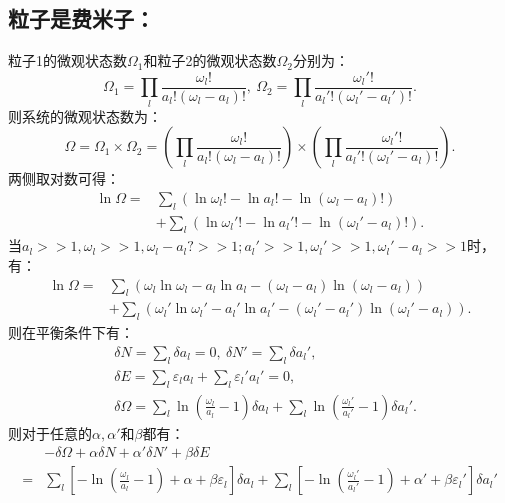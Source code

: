 \documentclass[a4paper,12pt]{article}
\begin{document}
\subsection{粒子是费米子：}
粒子1的微观状态数$\Omega_1$和粒子2的微观状态数$\Omega_2$分别为：
\begin{equation}\nonumber
	\Omega_1 = \prod_l \frac{\omega_l!}{a_l!(\omega_l - a_l)!}, ~ \Omega_2 = \prod_l \frac{\omega_l'!}{a_l'!(\omega_l' - a_l')!}.
\end{equation}
则系统的微观状态数为：
\begin{equation}\nonumber
	\Omega = \Omega_1 \times \Omega_2 = \left( \prod_l \frac{\omega_l!}{a_l!(\omega_l - a_l)!} \right) \times \left( \prod_l \frac{\omega_l'!}{a_l'!(\omega_l' - a_l)!} \right). 
\end{equation}
两侧取对数可得：
\begin{equation}\nonumber
\begin{aligned}
	\ln \Omega =& \sum_l \left( \ln\omega_l! - \ln a_l! - \ln (\omega_l - a_l)! \right)\\ 
	&+ \sum_l \left( \ln\omega_l'! - \ln a_l'! -\ln (\omega_l' - a_l)! \right).
\end{aligned}
\end{equation}
当$a_l>>1,\omega_l>>1,\omega_l-a_l?>>1;a_l'>>1,\omega_l'>>1,\omega_l'-a_l>>1$时，有：
\begin{equation}\nonumber
\begin{aligned}
	\ln \Omega =& \sum_l \left( \omega_l\ln\omega_l - a_l \ln a_l - (\omega_l - a_l)\ln (\omega_l - a_l) \right) \\ 
	&+ \sum_l \left( \omega_l'\ln\omega_l' - a_l' \ln a_l' - (\omega_l' - a_l')\ln (\omega_l' - a_l) \right).
\end{aligned}
\end{equation}
则在平衡条件下有：
\begin{equation}\nonumber
\begin{aligned}
	&\delta N = \sum_l \delta a_l = 0, ~ \delta N' = \sum_l \delta a_l', \\
	&\delta E = \sum_l \varepsilon_l a_l + \sum_l \varepsilon_l' a_l' = 0, \\
	&\delta \Omega = \sum_l \ln\left( \frac{\omega_l}{a_l} - 1 \right) \delta a_l + \sum_l \ln \left( \frac{\omega_l'}{a_l'} - 1 \right) \delta a_l'.
\end{aligned}
\end{equation}
则对于任意的$\alpha,\alpha'$和$\beta$都有：
\begin{equation}\nonumber
\begin{aligned}
	&-\delta \Omega + \alpha \delta N + \alpha' \delta N' + \beta \delta E \\
	=& \sum_l \left[ -\ln \left( \frac{\omega_l}{a_l} - 1 \right) + \alpha + \beta \varepsilon_l \right] \delta a_l + \sum_l \left[ -\ln \left( \frac{\omega_l'}{a_l'} - 1 \right) + \alpha' + \beta \varepsilon_l' \right] \delta a_l'
\end{aligned}
\end{equation}
\end{document}
